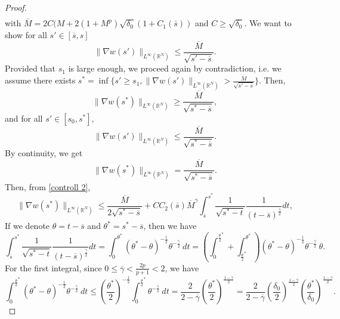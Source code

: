 \documentclass[11pt,a4paper]{article}
\newcommand{\1}{\mathbbm{1}}
\numberwithin{equation}{section}
\newcommand{\numberset}{\mathbb}
\newcommand{\R}{\numberset{R}}
\theoremstyle{remark}
\begin{document}
\begin{proof}
\begin{equation}
\begin{split}
\end{split}
\end{equation}
with $\overline{M}=2C(M+2(1+M^p)\sqrt{\delta_0}(1+C_1(\bar s))$ and $C\geq \sqrt{\delta_0}$. We want to show for all $s'\in[\overline{s},s]$
\begin{equation*}
\|\nabla w(s')\|_{L^\infty(\R^N)}\leq \frac{\overline{M}}{\sqrt{s'-\overline{s}}}.
\end{equation*}
Provided that $s_1$ is large enough, we proceed again by contradiction, i.e. we assume there exists $s^*=\inf\{s'\geq s_1, \|\nabla w(s')\|_{L^\infty(\R^N)}>\frac{\overline{M}}{\sqrt{s'-\overline{s}}}\}$.  Then,
\begin{equation}\label{absurde hyp}
\|\nabla w(s^*)\|_{L^\infty(\R^N)}\geq \frac{\overline{M}}{\sqrt{s^*-\overline{s}}},
\end{equation}
and for all $s'\in [s_0,s^*]$,
\begin{equation*}
\|\nabla w(s')\|_{L^\infty(\R^N)}\leq \frac{\overline{M}}{\sqrt{s^*-\overline{s}}}.
\end{equation*}
By continuity, we get
\begin{equation}\label{contradition 2}
\|\nabla w(s^*)\|_{L^\infty(\R^N)}= \frac{\overline{M}}{\sqrt{s^*-\overline{s}}}.
\end{equation}
Then, from \eqref{controll 2},
\begin{equation}\label{lemma s^*}
\|\nabla w(s^*)\|_{L^\infty(\R^N)}\leq \frac{\overline{M}}{2\sqrt{s^*-\overline{s}}}+CC_2(\overline{s})\overline{M}^{\overline{\gamma}}\int^{s^*}_{\overline{s}}\frac{1}{\sqrt{s^*-t}}\frac{1}{(t-\overline{s})^{\frac{\overline{\gamma}}{2}} }dt,
\end{equation}
If we denote $\theta=t-\overline{s}$ and $\theta^*=s^*-\overline{s}$, then we have 
$$\int^{s^*}_{\overline{s}}\frac{1}{\sqrt{s^*-t}}\frac{1}{(t-\overline{s})^{\frac{\overline{\gamma}}{2}} }dt=\int^{\theta^*}_0(\theta^*-\theta)^{-\frac{1}{2}}\theta^{-\frac{\overline{\gamma}}{2}}\ dt= \left(\int^{\frac{\theta}{2}^*}_0+\int^{\theta^*}_{\frac{\theta}{2}^*}\right)(\theta^*-\theta)^{-\frac{1}{2}}\theta^{-\frac{\overline{\gamma}}{2}}\ \theta.$$
For the first integral, since $0\leq\overline{\gamma}<\frac{2p}{p+1}<2$, we have 
$$\int^{\frac{\theta}{2}^*}_0 (\theta^*-\theta)^{-\frac{1}{2}}\theta^{-\frac{\overline{\gamma}}{2}}\ dt\leq \left(\frac{\theta^*}{2}\right)^{-\frac{1}{2}}\int^{\frac{\theta}{2}^*}_0 \theta^{-\frac{\overline{\gamma}}{2}}\ dt=\frac{2}{2-\overline{\gamma}}\left(\frac{\theta^*}{2}\right)^{\frac{1-\overline{\gamma}}{2}}=\frac{2}{2-\overline{\gamma}}\left(\frac{\delta_0}{2}\right)^{\frac{1-\overline{\gamma}}{2}}\left(\frac{\theta^*}{\delta_0}\right)^{\frac{1-\overline{\gamma}}{2}}.$$

\end{proof}
\end{document}
